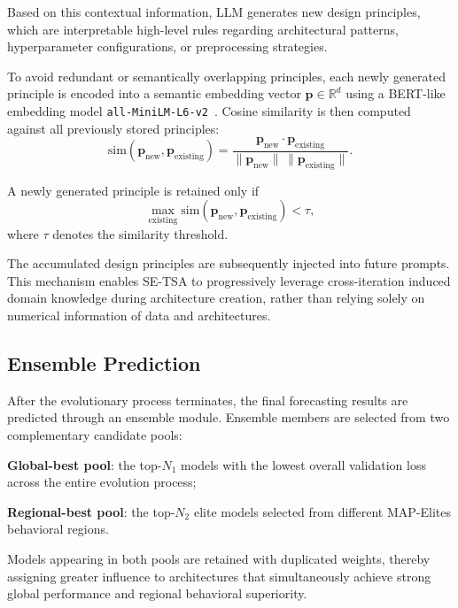 Based on this contextual information, LLM generates new design principles, which are interpretable high-level rules regarding architectural patterns, hyperparameter configurations, or preprocessing strategies.

To avoid redundant or semantically overlapping principles, each newly generated principle is encoded into a semantic embedding vector $\mathbf{p} \in \mathbb{R}^{d}$ using a BERT-like embedding model \texttt{all-MiniLM-L6-v2}~\cite{BERT,Sentence_BERT}. Cosine similarity is then computed against all previously stored principles:
\begin{equation}
\text{sim}(\mathbf{p}_{\text{new}}, \mathbf{p}_{\text{existing}}) = \frac{\mathbf{p}_{\text{new}} \cdot \mathbf{p}_{\text{existing}}}{\|\mathbf{p}_{\text{new}}\| \, \|\mathbf{p}_{\text{existing}}\|}.
\end{equation}

A newly generated principle is retained only if
\begin{equation}
\max_{\text{existing}} \text{sim}(\mathbf{p}_{\text{new}}, \mathbf{p}_{\text{existing}}) < \tau,
\end{equation}
where $\tau$ denotes the similarity threshold.

The accumulated design principles are subsequently injected into future prompts. This mechanism enables SE-TSA to progressively leverage cross-iteration induced domain knowledge during architecture creation, rather than relying solely on numerical information of data and architectures.

\subsection{Ensemble Prediction}

After the evolutionary process terminates, the final forecasting results are predicted through an ensemble module. Ensemble members are selected from two complementary candidate pools:

\textbf{Global-best pool}: the top-$N_1$ models with the lowest overall validation loss across the entire evolution process;

\textbf{Regional-best pool}: the top-$N_2$ elite models selected from different MAP-Elites behavioral regions.

Models appearing in both pools are retained with duplicated weights, thereby assigning greater influence to architectures that simultaneously achieve strong global performance and regional behavioral superiority.


